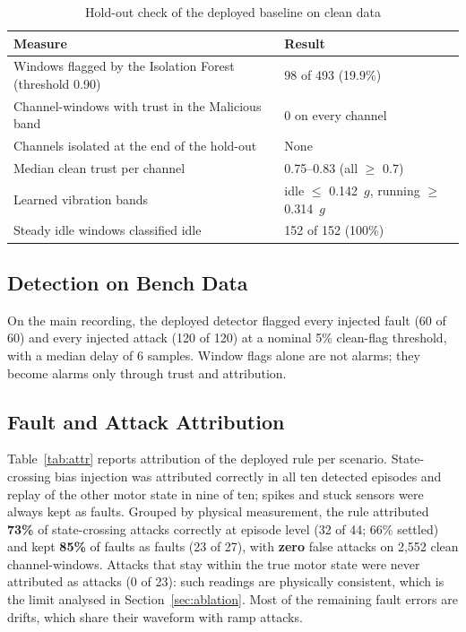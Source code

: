 \documentclass[11pt,a4paper]{article}
\begin{document}
\begin{table}[H]
\centering
\caption{Hold-out check of the deployed baseline on clean data}
\label{tab:holdout}
\small
\begin{tabularx}{\textwidth}{@{}X l@{}}
\toprule
\textbf{Measure} & \textbf{Result} \\
\midrule
Windows flagged by the Isolation Forest (threshold 0.90) & 98 of 493 (19.9\%) \\
Channel-windows with trust in the Malicious band & 0 on every channel \\
Channels isolated at the end of the hold-out & None \\
Median clean trust per channel & 0.75--0.83 (all $\geq$ 0.7) \\
Learned vibration bands & idle $\leq$ 0.142~$g$, running $\geq$ 0.314~$g$ \\
Steady idle windows classified idle & 152 of 152 (100\%) \\
\bottomrule
\end{tabularx}
\end{table}

\subsection{Detection on Bench Data}

On the main recording, the deployed detector flagged every injected fault (60 of 60) and every injected attack (120 of 120) at a nominal 5\% clean-flag threshold, with a median delay of 6 samples. Window flags alone are not alarms; they become alarms only through trust and attribution.

\subsection{Fault and Attack Attribution}

Table~\ref{tab:attr} reports attribution of the deployed rule per scenario. State-crossing bias injection was attributed correctly in all ten detected episodes and replay of the other motor state in nine of ten; spikes and stuck sensors were always kept as faults. Grouped by physical measurement, the rule attributed \textbf{73\%} of state-crossing attacks correctly at episode level (32 of 44; 66\% settled) and kept \textbf{85\%} of faults as faults (23 of 27), with \textbf{zero} false attacks on 2,552 clean channel-windows. Attacks that stay within the true motor state were never attributed as attacks (0 of 23): such readings are physically consistent, which is the limit analysed in Section~\ref{sec:ablation}. Most of the remaining fault errors are drifts, which share their waveform with ramp attacks.
\end{document}

